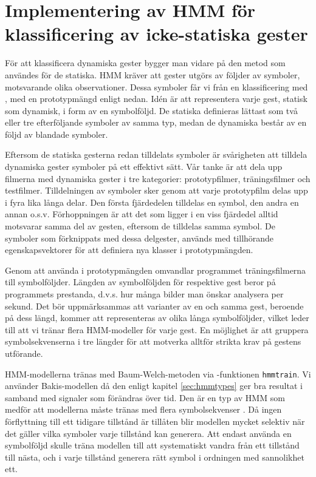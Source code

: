 \documentclass[../rapport_MVEX01-11-05]{subfiles}
\begin{document}
\section{Implementering av HMM för klassificering av icke-statiska gester}
För att klassificera dynamiska gester bygger man vidare på den metod som användes
för de statiska.  HMM kräver att gester utgörs av följder av symboler,
motsvarande olika observationer. Dessa symboler får vi från en 
klassificering med \knn, med en prototypmängd enligt nedan.
Idén är att representera varje gest, statisk som dynamisk, i form av en
symbolföljd.  De statiska definieras lättast som två eller tre efterföljande
symboler av samma typ, medan de dynamiska består av en följd av blandade
symboler.

Eftersom de statiska gesterna redan tilldelats
symboler är svårigheten att tilldela dynamiska gester symboler på ett effektivt sätt. Vår tanke
är att dela upp filmerna med dynamiska gester i tre kategorier: prototypfilmer, träningsfilmer och 
testfilmer. Tilldelningen av symboler sker genom att varje prototypfilm
delas upp i fyra lika långa delar. Den 
första fjärdedelen tilldelas en symbol, den andra en annan o.s.v.
Förhoppningen är att det som ligger i en viss fjärdedel alltid motsvarar samma
del av gesten, eftersom de tilldelas samma symbol.
De symboler som förknippats med dessa delgester, används med
tillhörande egenskapsvektorer för att definiera nya klasser i prototypmängden.

Genom att använda \knn i prototypmängden omvandlar programmet träningsfilmerna
till symbolföljder.
Längden av 
symbolföljden för respektive gest beror på programmets prestanda, d.v.s. hur många bilder 
man önskar analysera per sekund. Det bör uppmärksammas att varianter av en och
samma gest,
beroende på dess längd, kommer att representeras av olika långa symbolföljder,
vilket leder till att vi tränar flera HMM-modeller för varje gest.
En möjlighet är att gruppera symbolsekvenserna 
i tre längder för att motverka alltför strikta krav på gestens utförande. 

HMM-modellerna tränas med Baum-Welch-metoden via \MATLAB-funktionen \texttt{hmmtrain}.
Vi använder Bakis-modellen då den enligt kapitel \ref{sec:hmmtypes}
ger bra resultat i samband med signaler som förändras över tid.
Den är en typ av HMM som medför att
modellerna måste tränas med flera symbolsekvenser \cite{Rabiner89}.
Då ingen förflyttning till ett tidigare
tillstånd är tillåten blir modellen mycket selektiv när det gäller
vilka symboler varje tillstånd kan generera. 
Att endast använda en symbolföljd skulle träna modellen till att systematiskt
vandra från ett tillstånd till nästa,
och i varje tillstånd generera rätt symbol i ordningen med sannolikhet ett.
\end{document}
